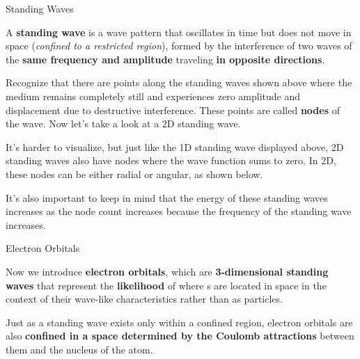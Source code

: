 \documentclass[10pt]{article}
\begin{document}
    \begin{core}{Standing Waves}

      A \textbf{standing wave} is a wave pattern that oscillates in time but does not move in space (\textit{confined to a restricted region}), formed by the interference of two waves of the \textbf{same frequency and amplitude} traveling \textbf{in opposite directions}.


      Recognize that there are points along the standing waves shown above where the medium remains completely still and experiences zero amplitude and displacement due to destructive interference. These points are called \textbf{nodes} of the wave. Now let's take a look at a 2D standing wave.


      It's harder to visualize, but just like the 1D standing wave displayed above, 2D standing waves also have nodes where the wave function sums to zero. In 2D, these nodes can be either radial or angular, as shown below.


      It's also important to keep in mind that the energy of these standing waves increases as the node count increases because the frequency of the standing wave increases.

    \end{core}

    \begin{core}{Electron Orbitals}

      Now we introduce \textbf{electron orbitals}, which are \textbf{3-dimensional standing waves} that represent the \textbf{likelihood} of where s are located in space in the context of their wave-like characteristics rather than as particles.


      Just as a standing wave exists only within a confined region, electron orbitals are also \textbf{confined in a space determined by the Coulomb attractions} between them and the nucleus of the atom.

    \end{core}
  
\end{document}
